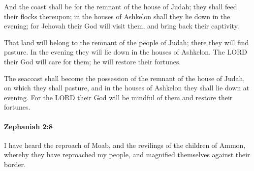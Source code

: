 			\begin{versebox}
					\item[BHS] 
					\item[LXX] 
					\item[ASV] And the coast shall be for the remnant of the house of Judah; they shall feed their flocks thereupon; in the houses of Ashkelon shall they lie down in the evening; for Jehovah their God will visit them, and bring back their captivity.
					\item[NIV] That land will belong to the remnant of the people of Judah; there they will find pasture. In the evening they will lie down in the houses of Ashkelon. The LORD their God will care for them; he will restore their fortunes.
					\item[NRSV] The seacoast shall become the possession of the remnant of the house of Judah, on which they shall pasture, and in the houses of Ashkelon they shall lie down at evening. For the LORD their God will be mindful of them and restore their fortunes.
			\end{versebox}

		\paragraph{Zephaniah 2:8} %
			\label{ZEPHANIAH-2-8}

			I have heard the reproach of Moab, and the revilings of the children of Ammon, whereby they have reproached my people, and magnified themselves against their border.

